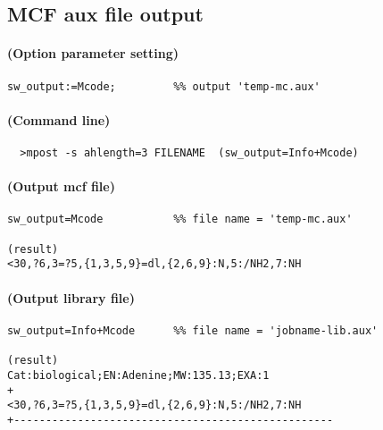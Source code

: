 \documentclass[a4paper]{article}
\begin{document}
\subsection{MCF aux file output}
\paragraph{(Option parameter setting)}
%
%
\begin{verbatim}
sw_output:=Mcode;         %% output 'temp-mc.aux'
\end{verbatim}
\paragraph{(Command line)}
\begin{verbatim}
  >mpost -s ahlength=3 FILENAME  (sw_output=Info+Mcode)
\end{verbatim}
\paragraph{(Output mcf file)}
\begin{verbatim}
sw_output=Mcode           %% file name = 'temp-mc.aux'

(result)
<30,?6,3=?5,{1,3,5,9}=dl,{2,6,9}:N,5:/NH2,7:NH

\end{verbatim}
\paragraph{(Output library file)}
\begin{verbatim}
sw_output=Info+Mcode      %% file name = 'jobname-lib.aux'

(result)
Cat:biological;EN:Adenine;MW:135.13;EXA:1
+
<30,?6,3=?5,{1,3,5,9}=dl,{2,6,9}:N,5:/NH2,7:NH
+--------------------------------------------------

\end{verbatim}
\end{document}
